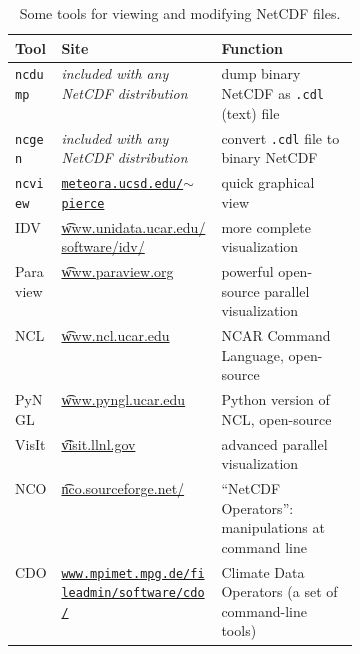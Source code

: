 \newcommand{\netcdftool}[1]{#1\index{NetCDF!tools!#1}}
\begin{table}[ht]
\centering
\caption{Some tools for viewing and modifying NetCDF files.}\label{tab:NetCDFview} 
\small
\begin{tabular}{llp{0.4\linewidth}}
  \\\toprule
  \textbf{Tool} & \textbf{Site} & \textbf{Function}\\ \midrule
\netcdftool{\texttt{ncdump}} & \emph{included with any NetCDF distribution} & dump binary NetCDF as \texttt{.cdl} (text) file \\
\netcdftool{\texttt{ncgen}} & \emph{included with any NetCDF distribution} & convert \texttt{.cdl} file to binary NetCDF \\
\netcdftool{\texttt{ncview}} & \href{http://meteora.ucsd.edu/~pierce/ncview_home_page.html}{\texttt{meteora.ucsd.edu/$\sim$pierce}} & quick graphical view \\
\netcdftool{IDV} & \href{http://www.unidata.ucar.edu/software/idv/}{\t{www.unidata.ucar.edu/software/idv/}} & more complete visualization \\
\netcdftool{Paraview} & \href{http://www.paraview.org}{\t{www.paraview.org}} & powerful open-source parallel visualization \\
\netcdftool{NCL} &  \href{http://www.ncl.ucar.edu}{\t{www.ncl.ucar.edu}} & NCAR Command Language, open-source\\
\netcdftool{PyNGL} &  \href{http://www.pyngl.ucar.edu}{\t{www.pyngl.ucar.edu}} & Python version of NCL, open-source\\
\netcdftool{VisIt} & \href{http://visit.llnl.gov}{\t{visit.llnl.gov}} & advanced parallel visualization \\
\netcdftool{NCO}\index{NCO (NetCDF Operators)} & \href{http://nco.sourceforge.net/}{\t{nco.sourceforge.net/}} & ``NetCDF Operators'': manipulations at command line\\
\netcdftool{CDO} & \href{http://www.mpimet.mpg.de/fileadmin/software/cdo/}{\texttt{www.mpimet.mpg.de/fileadmin/software/cdo/}} & Climate Data Operators (a set of command-line tools)
\\\bottomrule
\end{tabular}
\normalsize
\end{table}



